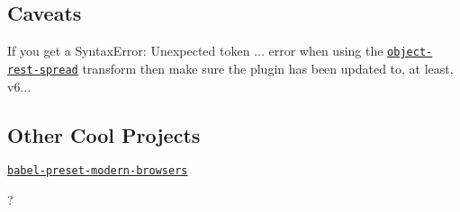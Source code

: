 \subsection*{Caveats}

If you get a {\ttfamily Syntax\+Error\+: Unexpected token ...} error when using the \href{https://github.com/babel/babel/tree/master/packages/babel-plugin-transform-object-rest-spread}{\tt object-\/rest-\/spread} transform then make sure the plugin has been updated to, at least, {\ttfamily v6..}.

\subsection*{Other Cool Projects}


\begin{DoxyItemize}
\item \href{https://github.com/christophehurpeau/babel-preset-modern-browsers}{\tt babel-\/preset-\/modern-\/browsers}
\item ? 
\end{DoxyItemize}